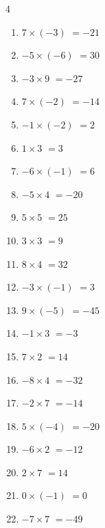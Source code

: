 \begin{multicols}{4}
\begin{enumerate}
  \item $7\times (-3)$
        $=-21$

  \item $-5\times (-6)$
        $=30$

  \item $-3\times 9$
        $=-27$

  \item $7\times (-2)$
        $=-14$

\columnbreak %

\resetques

  \item $-1\times (-2)$
        $=2$

  \item $1\times 3$
        $=3$

  \item $-6\times (-1)$
        $=6$

  \item $-5\times 4$
        $=-20$

  \item $5\times 5$
        $=25$

  \item $3\times 3$
        $=9$

  \item $8\times 4$
        $=32$

  \item $-3\times (-1)$
        $=3$

  \item $9\times (-5)$
        $=-45$

  \item $-1\times 3$
        $=-3$

  \item $7\times 2$
        $=14$

  \item $-8\times 4$
        $=-32$

  \item $-2\times 7$
        $=-14$

  \item $5\times (-4)$
        $=-20$

  \item $-6\times 2$
        $=-12$

  \item $2\times 7$
        $=14$

  \item $0\times (-1)$
        $=0$

  \item $-7\times 7$
        $=-49$


\end{enumerate}
\end{multicols}
